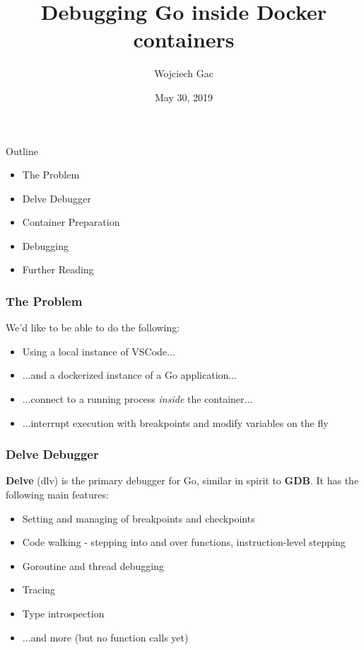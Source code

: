 \documentclass[pdf,xcolor=dvipsnames,noparindent]{beamer}
\title{Debugging Go inside Docker containers}
\author{Wojciech Gac}
\date{May 30, 2019}
\begin{document}
\begin{frame}
	\titlepage
\end{frame}

\begin{frame}{Outline}
	\pause
	\begin{itemize}
		\item The Problem
		      \pause
		\item Delve Debugger
		      \pause
		\item Container Preparation
		      \pause
		\item Debugging
		      \pause
		\item Further Reading
	\end{itemize}
\end{frame}

\begin{frame}
	\frametitle{The Problem}
	We'd like to be able to do the following:
	\pause
	\begin{itemize}
		\item Using a local instance of VSCode...
		      \pause
		\item ...and a dockerized instance of a Go application...
		      \pause
		\item ...connect to a running process \emph{inside} the container...
		      \pause
		\item ...interrupt execution with breakpoints and modify variables on the fly
	\end{itemize}
	  
\end{frame}

\begin{frame}
	\frametitle{Delve Debugger}
	\textbf{Delve} (dlv) is the primary debugger for Go, similar in
	spirit to \textbf{GDB}. It has the following main features:
	\pause
	\begin{itemize}
		\item Setting and managing of breakpoints and checkpoints
		      \pause
		\item Code walking - stepping into and over functions, instruction-level stepping
		      \pause
		\item Goroutine and thread debugging
		      \pause
		\item Tracing
		      \pause
		\item Type introspection
		      \pause
		\item ...and more (but no function calls yet)
	\end{itemize}
	  
\end{frame}
\end{document}
